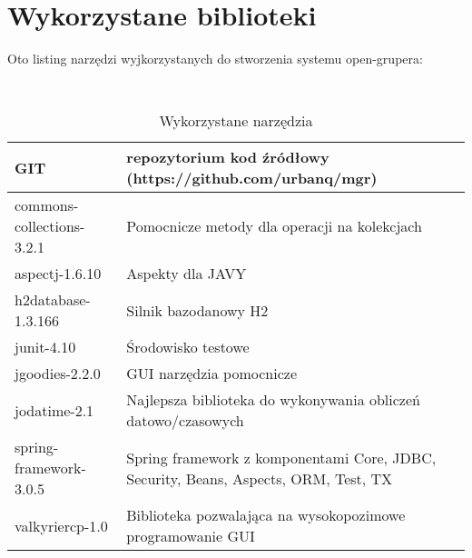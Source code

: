 
\section{Wykorzystane biblioteki}
\label{sec:wykorzystaneBiblioteki}
Oto listing narzędzi wyjkorzystanych do stworzenia systemu open-grupera:
\begin{table}[h]
 \caption{Wykorzystane narzędzia}
 \small\tt
 \centering
 \vspace{0in}
 \begin{tabular}{|l|p{7cm}|}
 \hline
 GIT & repozytorium kod źródłowy (https://github.com/urbanq/mgr) \\
 \hline
 commons-collections-3.2.1 & Pomocnicze metody dla operacji na kolekcjach \\
 \hline
 aspectj-1.6.10 & Aspekty dla JAVY \\
 \hline
 h2database-1.3.166 & Silnik bazodanowy H2 \\
 \hline
 junit-4.10 & Środowisko testowe \\
 \hline
 jgoodies-2.2.0 & GUI narzędzia pomocnicze \\
 \hline
 jodatime-2.1 & Najlepsza biblioteka do wykonywania obliczeń datowo/czasowych \\
 \hline
 spring-framework-3.0.5 & Spring framework z komponentami Core, JDBC, Security, Beans, Aspects, ORM, Test, TX \\
 \hline
 valkyriercp-1.0 & Biblioteka pozwalająca na wysokopozimowe programowanie GUI \\
 \hline
 \end{tabular}
\end{table}


